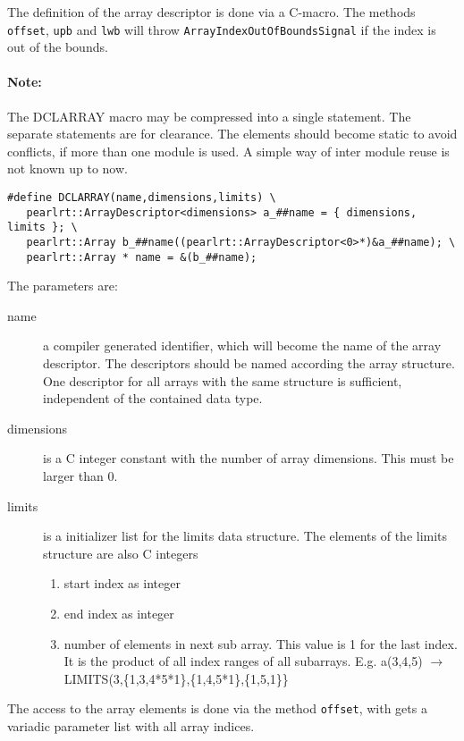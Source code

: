 The definition of the array descriptor is done via a C-macro.
The methods \verb|offset|, \verb|upb| and \verb|lwb| 
will throw \verb|ArrayIndexOutOfBoundsSignal|
if the index is out of the bounds.

\paragraph{Note:} The DCLARRAY macro may be compressed into a single statement.
The separate statements are for clearance.
The elements should become static to avoid conflicts, if more than 
one module is used. A simple way of inter module reuse is not known up to now.

\begin{verbatim}
#define DCLARRAY(name,dimensions,limits) \
   pearlrt::ArrayDescriptor<dimensions> a_##name = { dimensions, limits }; \
   pearlrt::Array b_##name((pearlrt::ArrayDescriptor<0>*)&a_##name); \
   pearlrt::Array * name = &(b_##name);
\end{verbatim}

The parameters are:
\begin{description}
\item[name] a compiler generated identifier, which will become
    the name  of the array descriptor. The descriptors should be 
    named according the array structure. One descriptor for all
    arrays with the same structure is sufficient, independent of
    the contained data type.
\item [dimensions] is a C integer constant with the number of 
   array dimensions. This must be larger than 0.
\item[limits] is a initializer list for the limits data structure.
   The elements of the limits structure are also C integers
   \begin{enumerate}
   \item start index as integer
   \item end index as integer
   \item number of elements in next sub array. This value is 1 for the 
     last index. It is the product of all index ranges of all subarrays.
     E.g. a(3,4,5) $\rightarrow$ LIMITS(3,\{1,3,4*5*1\},\{1,4,5*1\},\{1,5,1\}\}
   \end{enumerate}
\end{description}

The access to the array elements is done via the method \verb|offset|, 
with gets a variadic parameter list with all array indices.

